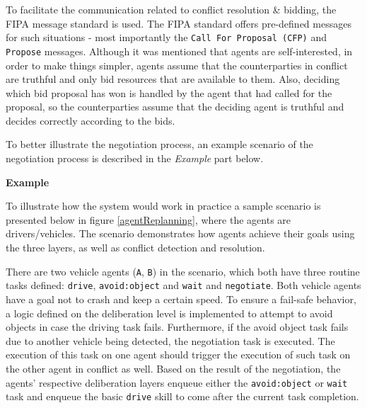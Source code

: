 \documentclass[0main.tex]{subfiles}
\begin{document}
To facilitate the communication related to conflict resolution \& bidding, the FIPA message
standard is used.  The FIPA standard offers pre-defined messages for such situations -
most importantly the \texttt{Call For Proposal (CFP)} and \texttt{Propose} messages. Although
it was mentioned that agents are self-interested, in order to make things simpler, agents 
assume that the counterparties in conflict are truthful and only bid resources that are
available to them. Also, deciding which bid proposal has won is handled by the agent that
had called for the proposal, so the counterparties assume that the deciding agent is
truthful and decides correctly according to the bids. 

To better illustrate the negotiation process, an example scenario of the negotiation process is 
described in the \emph{Example} part below.

\textbf{Example}

To illustrate how the system would work in practice a sample scenario is presented below in
figure \ref{agentReplanning}, where the agents are drivers/vehicles. The scenario demonstrates 
how agents achieve their goals using the three layers, as well as conflict detection and resolution.

There are two vehicle agents (\texttt{A}, \texttt{B}) in the scenario, which both have three routine tasks defined:
\texttt{drive}, \texttt{avoid:object} and \texttt{wait} and \texttt{negotiate}. Both vehicle
agents have a goal not to crash and keep a certain speed. To ensure a fail-safe behavior, 
a logic defined on the deliberation level is implemented to attempt to avoid objects in case the driving task
fails. Furthermore, if the avoid object task fails due to another vehicle being detected, the negotiation 
task is executed. The execution of this task on one agent should trigger the execution of such task on the 
other agent in conflict as well. Based on the result of the negotiation, the agents' respective 
deliberation layers enqueue either the \texttt{avoid:object} or \texttt{wait} task and enqueue the 
basic \texttt{drive} skill to come after the current task completion.
\end{document}
